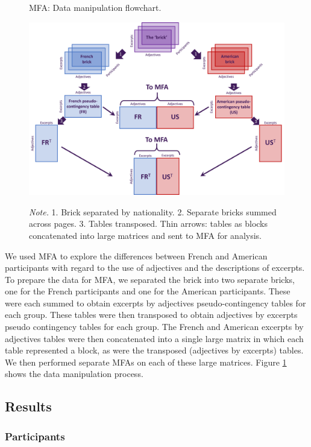 \documentclass[
  english,
  man,floatsintext]{apa6}
\begin{document}
\begin{figure}   
  \centering  
  \caption{MFA: Data manipulation flowchart.}
    \includegraphics[width=0.75\columnwidth]{./Music-Descriptor-Space_files/figure-latex/mfadataflow_cb.png}
  \label{fig:mfadataflow}
  \caption*{\footnotesize \textit{Note.} 1. Brick separated by nationality. 2. Separate bricks summed across pages. 3. Tables transposed. Thin arrows: tables as blocks concatenated into large matrices and sent to MFA for analysis.}
\end{figure}

We used MFA to explore the differences between French and American participants with regard to the use of adjectives and the descriptions of excerpts. To prepare the data for MFA, we separated the brick into two separate bricks, one for the French participants and one for the American participants. These were each summed to obtain excerpts by adjectives pseudo-contingency tables for each group. These tables were then transposed to obtain adjectives by excerpts pseudo contingency tables for each group. The French and American excerpts by adjectives tables were then concatenated into a single large matrix in which each table represented a block, as were the transposed (adjectives by excerpts) tables. We then performed separate MFAs on each of these large matrices. Figure \ref{fig:mfadataflow} shows the data manipulation process.

\hypertarget{results-1}{%
\subsection{Results}\label{results-1}}

\hypertarget{participants-3}{%
\subsubsection{Participants}\label{participants-3}}
\end{document}
